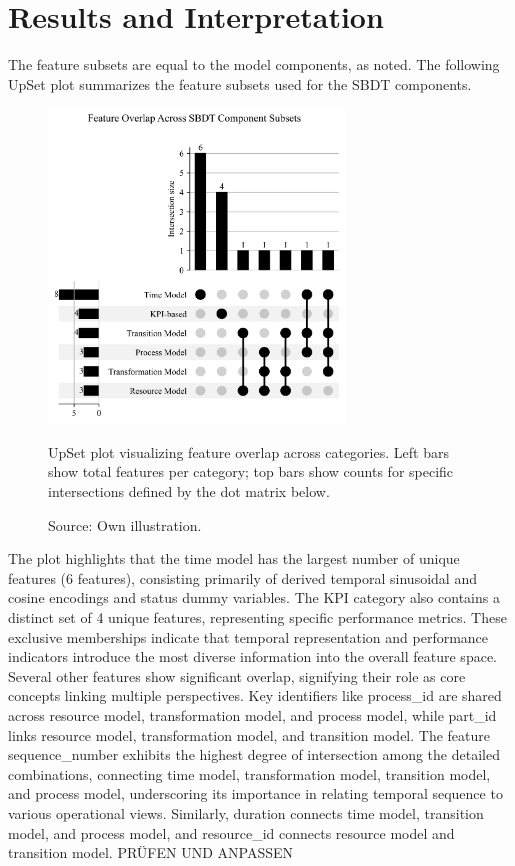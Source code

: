 \section{Results and Interpretation}
The feature subsets are equal to the model components, as noted. The following UpSet plot summarizes the feature subsets used for the SBDT components.

\begin{figure}[htbp]
  \centering
  \includegraphics[width=0.7\textwidth]{figures/upset.png}
  \caption{UpSet plot visualizing feature overlap across categories. Left bars show total features per category; top bars show counts for specific intersections defined by the dot matrix below.}
  \caption*{Source: Own illustration.}
  \label{fig:upsetplot}
\end{figure}

The plot highlights that the time model has the largest number of unique features (6 features), consisting primarily of derived temporal sinusoidal and cosine encodings and status dummy variables. The KPI category also contains a distinct set of 4 unique features, representing specific performance metrics. These exclusive memberships indicate that temporal representation and performance indicators introduce the most diverse information into the overall feature space.
Several other features show significant overlap, signifying their role as core concepts linking multiple perspectives. Key identifiers like process\_id are shared across resource model, transformation model, and process model, while part\_id links resource model, transformation model, and transition model. The feature sequence\_number exhibits the highest degree of intersection among the detailed combinations, connecting time model, transformation model, transition model, and process model, underscoring its importance in relating temporal sequence to various operational views. Similarly, duration connects time model, transition model, and process model, and resource\_id connects resource model and transition model. PRÜFEN UND ANPASSEN

